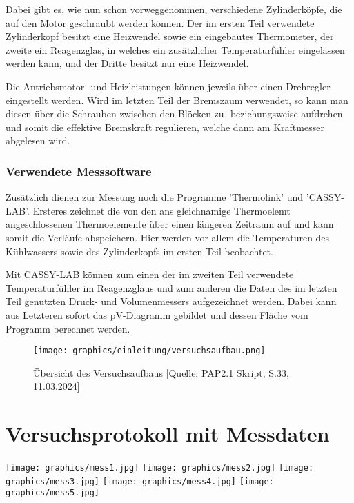 \documentclass{article}
\begin{document}
Dabei gibt es, wie nun schon vorweggenommen, verschiedene Zylinderköpfe, die auf den Motor geschraubt werden können. Der im ersten Teil verwendete Zylinderkopf besitzt eine Heizwendel sowie ein eingebautes Thermometer, der zweite ein Reagenzglas, in welches ein zusätzlicher Temperaturfühler eingelassen werden kann, und der Dritte besitzt nur eine Heizwendel.

Die Antriebsmotor- und Heizleistungen können jeweils über einen Drehregler eingestellt werden. Wird im letzten Teil der Bremszaum verwendet, so kann man diesen über die Schrauben zwischen den Blöcken zu- beziehungsweise aufdrehen und somit die effektive Bremskraft regulieren, welche dann am Kraftmesser abgelesen wird. 

\subsubsection{Verwendete Messsoftware}

Zusätzlich dienen zur Messung noch die Programme 'Thermolink' und 'CASSY-LAB'. Ersteres zeichnet die von den ans gleichnamige Thermoelemt angeschlossenen Thermoelemente über einen längeren Zeitraum auf und kann somit die Verläufe abspeichern. Hier werden vor allem die Temperaturen des Kühlwassers sowie des Zylinderkopfs im ersten Teil beobachtet. 

Mit CASSY-LAB können zum einen der im zweiten Teil verwendete Temperaturfühler im Reagenzglaus und zum anderen die Daten des im letzten Teil genutzten Druck- und Volumenmessers aufgezeichnet werden. Dabei kann aus Letzteren sofort das pV-Diagramm gebildet und dessen Fläche vom Programm berechnet werden.

\begin{figure}[!b]
    \centering
    \texttt{[image: graphics/einleitung/versuchsaufbau.png]}
    \caption{Übersicht des Versuchsaufbaus [Quelle: PAP2.1 Skript, S.33, 11.03.2024]}
    \label{fig:aufbau}
\end{figure}


\newpage

\section{Versuchsprotokoll mit Messdaten}

\texttt{[image: graphics/mess1.jpg]}
\newpage
\texttt{[image: graphics/mess2.jpg]}
\newpage
\texttt{[image: graphics/mess3.jpg]}
\newpage
\texttt{[image: graphics/mess4.jpg]}
\newpage
\texttt{[image: graphics/mess5.jpg]}
\newpage
\end{document}
